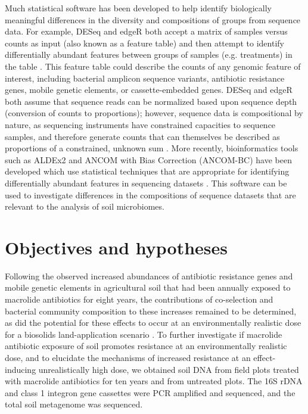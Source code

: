 Much statistical software has been developed to help identify biologically meaningful differences in the diversity and compositions of groups from sequence data.
For example, DESeq and edgeR both accept a matrix of samples versus counts as input (also known as a feature table) and then attempt to identify differentially abundant features between groups of samples (e.g. treatments) in the table \parencite{Anders.2010, Robinson.2010}.
This feature table could describe the counts of any genomic feature of interest, including bacterial amplicon sequence variants, antibiotic resistance genes, mobile genetic elements, or cassette-embedded genes.
DESeq and edgeR both assume that sequence reads can be normalized based upon sequence depth (conversion of counts to proportions); however, sequence data is compositional by nature, as sequencing instruments have constrained capacities to sequence samples, and therefore generate counts that can themselves be described as proportions of a constrained, unknown sum \parencite{Gloor.2017}.
More recently, bioinformatics tools such as ALDEx2 and ANCOM with Bias Correction (ANCOM-BC) have been developed which use statistical techniques that are appropriate for identifying differentially abundant features in sequencing datasets \parencite{Fernandes.2014, Lin.2020}.
This software can be used to investigate differences in the compositions of sequence datasets that are relevant to the analysis of soil microbiomes.

\section{Objectives and hypotheses}

Following the observed increased abundances of antibiotic resistance genes and mobile genetic elements in agricultural soil that had been annually exposed to macrolide antibiotics for eight years, the contributions of co-selection and bacterial community composition to these increases remained to be determined, as did the potential for these effects to occur at an environmentally realistic dose for a biosolids land-application scenario \parencite{Lau.2020}.
To further investigate if macrolide antibiotic exposure of soil promotes resistance at an environmentally realistic dose, and to elucidate the mechanisms of increased resistance at an effect-inducing unrealistically high dose, we obtained soil DNA from field plots treated with macrolide antibiotics for ten years and from untreated plots.
The 16S rDNA and class 1 integron gene cassettes were PCR amplified and sequenced, and the total soil metagenome was sequenced.

